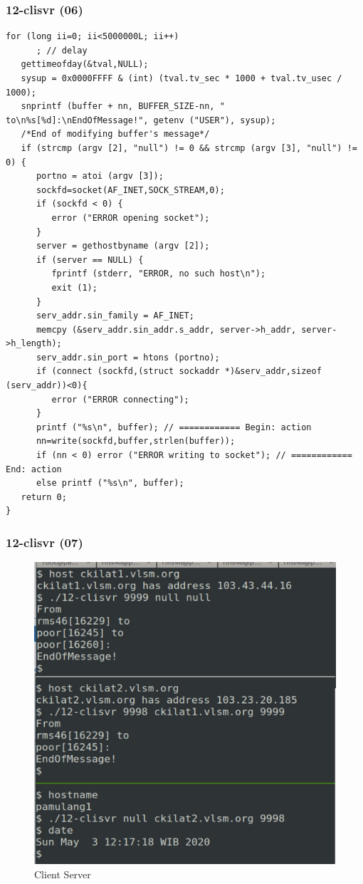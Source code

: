 \documentclass[aspectratio=169, xcolor=table, notheorems, hyperref={pdfpagelabels=false}]{beamer}
\begin{document}
\begin{frame}[fragile]
\frametitle{12-clisvr (06)}
\begin{lstlisting}[basicstyle=\ttfamily\tiny]
   for (long ii=0; ii<5000000L; ii++)
      ; // delay
   gettimeofday(&tval,NULL);
   sysup = 0x0000FFFF & (int) (tval.tv_sec * 1000 + tval.tv_usec / 1000);
   snprintf (buffer + nn, BUFFER_SIZE-nn, " to\n%s[%d]:\nEndOfMessage!", getenv ("USER"), sysup);
   /*End of modifying buffer's message*/
   if (strcmp (argv [2], "null") != 0 && strcmp (argv [3], "null") != 0) {
      portno = atoi (argv [3]);
      sockfd=socket(AF_INET,SOCK_STREAM,0);
      if (sockfd < 0) {
         error ("ERROR opening socket");
      }
      server = gethostbyname (argv [2]);
      if (server == NULL) {
         fprintf (stderr, "ERROR, no such host\n");
         exit (1);
      }
      serv_addr.sin_family = AF_INET;
      memcpy (&serv_addr.sin_addr.s_addr, server->h_addr, server->h_length);
      serv_addr.sin_port = htons (portno);
      if (connect (sockfd,(struct sockaddr *)&serv_addr,sizeof (serv_addr))<0){
         error ("ERROR connecting");
      }
      printf ("%s\n", buffer); // ============ Begin: action
      nn=write(sockfd,buffer,strlen(buffer));
      if (nn < 0) error ("ERROR writing to socket"); // ============ End: action
      else printf ("%s\n", buffer);
   return 0;
}

\end{lstlisting}
\end{frame}

\begin{frame}[fragile]
\frametitle{12-clisvr (07)}

\begin{figure}
\includegraphics[width=0.43\linewidth]{os-clisvr}
\caption{Client Server}
\end{figure}

\end{frame}
\end{document}
